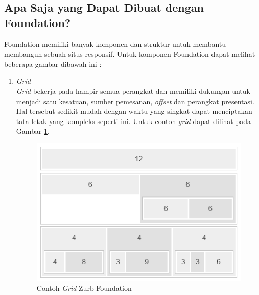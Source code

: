 \begin{itemize}
\begin{itemize}

\subsection{Apa Saja yang Dapat Dibuat dengan Foundation?}
Foundation memiliki banyak komponen dan struktur untuk membantu membangun sebuah
situs responsif. Untuk komponen Foundation dapat melihat beberapa gambar dibawah
ini :

\begin{enumerate}[(1)]
\item {\it Grid}\\
{\it Grid} bekerja pada hampir semua perangkat dan memiliki dukungan untuk menjadi
satu kesatuan, sumber pemesanan, {\it offset} dan perangkat presentasi. Hal
tersebut sedikit mudah dengan waktu yang singkat dapat menciptakan tata letak yang
kompleks seperti ini. Untuk contoh {\it grid} dapat dilihat pada Gambar
\ref{fig:grid}.

\begin{figure}[H]
\centering
\includegraphics[scale=0.7]{Gambar/grid.png}
\caption[Contoh {\it Grid} Zurb Foundation]{Contoh {\it Grid} Zurb Foundation}
\label{fig:grid}
\end{figure}


\end{enumerate}
\end{itemize}
\end{itemize}
